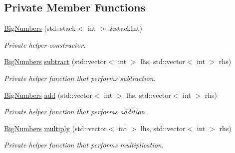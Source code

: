 \subsection*{Private Member Functions}
\begin{DoxyCompactItemize}
\item 
\mbox{\label{class_big_numbers_a5bd81464d46ff6fa0e80aa64093af1ff}} 
\mbox{\hyperlink{class_big_numbers_a5bd81464d46ff6fa0e80aa64093af1ff}{Big\+Numbers}} (std\+::stack$<$ int $>$ \&stack\+Int)
\begin{DoxyCompactList}\small\item\em Private helper constructor. \end{DoxyCompactList}\item 
\mbox{\label{class_big_numbers_a9109b7a17b66089315a27649ef20a8e0}} 
\mbox{\hyperlink{class_big_numbers}{Big\+Numbers}} \mbox{\hyperlink{class_big_numbers_a9109b7a17b66089315a27649ef20a8e0}{subtract}} (std\+::vector$<$ int $>$ lhs, std\+::vector$<$ int $>$ rhs)
\begin{DoxyCompactList}\small\item\em Private helper function that performs subtraction. \end{DoxyCompactList}\item 
\mbox{\label{class_big_numbers_ad5145c30bda0b24e585fbfcf1e24e058}} 
\mbox{\hyperlink{class_big_numbers}{Big\+Numbers}} \mbox{\hyperlink{class_big_numbers_ad5145c30bda0b24e585fbfcf1e24e058}{add}} (std\+::vector$<$ int $>$ lhs, std\+::vector$<$ int $>$ rhs)
\begin{DoxyCompactList}\small\item\em Private helper function that performs addition. \end{DoxyCompactList}\item 
\mbox{\label{class_big_numbers_aaa4248b6478e04df5765c1c3d8587cc5}} 
\mbox{\hyperlink{class_big_numbers}{Big\+Numbers}} \mbox{\hyperlink{class_big_numbers_aaa4248b6478e04df5765c1c3d8587cc5}{multiply}} (std\+::vector$<$ int $>$ lhs, std\+::vector$<$ int $>$ rhs)
\begin{DoxyCompactList}\small\item\em Private helper function that performs multiplication. \end{DoxyCompactList}\end{DoxyCompactItemize}
